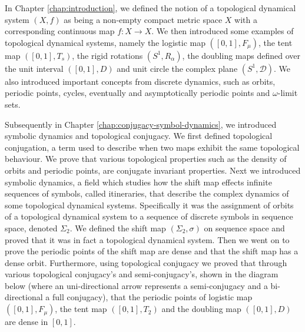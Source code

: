 In Chapter \ref{chap:introduction}, we defined the notion of a topological dynamical system $(X, f)$ as being a non-empty compact metric space $X$ with a corresponding continuous map $f: X \to X$. We then introduced some examples of topological dynamical systems, namely the logistic map $([0, 1], F_\mu)$, the tent map $([0, 1], T_s)$, the rigid rotations $(S^1, R_\alpha)$, the doubling maps defined over the unit interval $([0, 1], D)$ and unit circle the complex plane $(S^1, \mathcal{D})$. We also introduced important concepts from discrete dynamics, such as orbits, periodic points, cycles, eventually and asymptotically periodic points and $\omega$-limit sets.

Subsequently in Chapter \ref{chap:conjugacy-symbol-dynamics}, we introduced symbolic dynamics and topological conjugacy. We first defined topological conjugation, a term used to describe when two maps exhibit the same topological behaviour. We prove that various topological properties such as the density of orbits and periodic points, are conjugate invariant properties. Next we introduced symbolic dynamics, a field which studies how the shift map effects infinite sequences of symbols, called itineraries, that describe the complex dynamics of some topological dynamical systems. Specifically it was the assignment of orbits of a topological dynamical system to a sequence of discrete symbols in sequence space, denoted $\Sigma_2$. We defined the shift map $(\Sigma_2, \sigma)$ on sequence space and proved that it was in fact a topological dynamical system. Then we went on to prove the periodic points of the shift map are dense and that the shift map has a dense orbit. Furthermore, using topological conjugacy we proved that through various topological conjugacy's and semi-conjugacy's, shown in the diagram below (where an uni-directional arrow represents a semi-conjugacy and a bi-directional a full conjugacy), that the periodic points of logistic map $([0, 1], F_\mu)$, the tent map $([0, 1], T_2)$ and the doubling map $([0, 1], D)$ are dense in $[0, 1]$.

